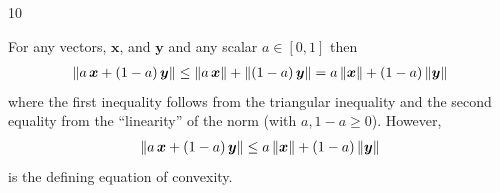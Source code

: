 \documentclass{sotonExamBoxes}    %
\begin{document}


\begin{question}{10}
  \begin{qparts}
    \begin{answer}
      For any vectors, $\bm{x}$, and $\bm{y}$ and any scalar
      $a\in[0,1]$ then
      \begin{align*}
        \| a\, \bm{x} + (1-a)\, \bm{y} \| \leq \| a\,\bm{x} \| +
        \| (1-a)\,\bm{y} \| = a\, \| \bm{x} \| + (1-a)\, \| \bm{y} \|
      \end{align*}
      where the first inequality follows from the triangular
      inequality and the second equality from the ``linearity'' of the
      norm (with $a,1-a\geq0$).  However,
      \begin{align*}
         \| a\, \bm{x} + (1-a)\, \bm{y} \| \leq a\, \| \bm{x} \| + (1-a)\, \| \bm{y} \|
      \end{align*}
      is the defining equation of convexity.
    \end{answer}
    \clearpage



\end{qparts}
\end{question}
\end{document}
